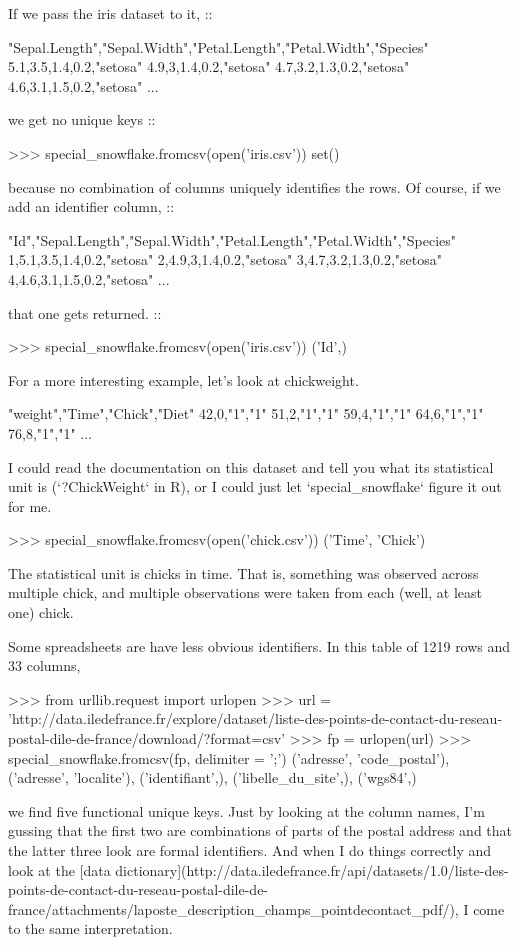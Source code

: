 \documentclass{acm_proc_article-sp}
\begin{document}
If we pass the iris dataset to it, ::

    "Sepal.Length","Sepal.Width","Petal.Length","Petal.Width","Species"
    5.1,3.5,1.4,0.2,"setosa"
    4.9,3,1.4,0.2,"setosa"
    4.7,3.2,1.3,0.2,"setosa"
    4.6,3.1,1.5,0.2,"setosa"
    ...

we get no unique keys ::

    >>> special_snowflake.fromcsv(open('iris.csv'))                                                                  
    set()

because no combination of columns uniquely identifies the rows.
Of course, if we add an identifier column, ::

    "Id","Sepal.Length","Sepal.Width","Petal.Length","Petal.Width","Species"
    1,5.1,3.5,1.4,0.2,"setosa"
    2,4.9,3,1.4,0.2,"setosa"
    3,4.7,3.2,1.3,0.2,"setosa"
    4,4.6,3.1,1.5,0.2,"setosa"
    ...

that one gets returned. ::

    >>> special_snowflake.fromcsv(open('iris.csv'))                                                                  
    {('Id',)}

For a more interesting example, let's look at chickweight.

    "weight","Time","Chick","Diet"
    42,0,"1","1"
    51,2,"1","1"
    59,4,"1","1"
    64,6,"1","1"
    76,8,"1","1"
    ...

I could read the documentation on this dataset and tell you
what its statistical unit is (`?ChickWeight` in R), or I could
just let `special_snowflake` figure it out for me.

    >>> special_snowflake.fromcsv(open('chick.csv'))
    {('Time', 'Chick')}

The statistical unit is chicks in time. That is, something was
observed across multiple chick, and multiple observations were
taken from each (well, at least one) chick.

Some spreadsheets are have less obvious identifiers. In this
table of 1219 rows and 33 columns,

    >>> from urllib.request import urlopen
    >>> url = 'http://data.iledefrance.fr/explore/dataset/liste-des-points-de-contact-du-reseau-postal-dile-de-france/download/?format=csv'
    >>> fp = urlopen(url)
    >>> special_snowflake.fromcsv(fp, delimiter = ';')
    {('adresse', 'code_postal'),
     ('adresse', 'localite'),
     ('identifiant',),
     ('libelle_du_site',),
     ('wgs84',)}

we find five functional unique keys. Just by looking at the column names,
I'm gussing that the first two are combinations of parts of the postal address
and that the latter three look are formal identifiers.
And when I do things correctly and look at the
[data dictionary](http://data.iledefrance.fr/api/datasets/1.0/liste-des-points-de-contact-du-reseau-postal-dile-de-france/attachments/laposte_description_champs_pointdecontact_pdf/),
I come to the same interpretation.
\end{document}
